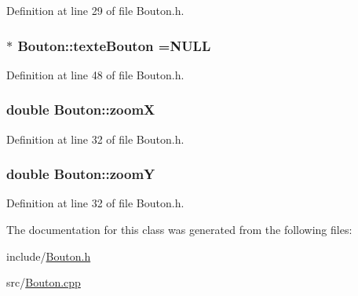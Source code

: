 Definition at line 29 of file Bouton.\+h.

\hypertarget{class_bouton_a71cfadd4002fcb9f21feeea2ace385be}{}
\subsubsection[{texte\+Bouton}]{$\ast$ Bouton\+::texte\+Bouton ={\bf N\+U\+L\+L}}\label{class_bouton_a71cfadd4002fcb9f21feeea2ace385be}


Definition at line 48 of file Bouton.\+h.

\hypertarget{class_bouton_ad2f8b0abcd023cbca599bca0af297192}{}
\subsubsection[{zoom\+X}]{\setlength{\rightskip}{0pt plus 5cm}double Bouton\+::zoom\+X}\label{class_bouton_ad2f8b0abcd023cbca599bca0af297192}


Definition at line 32 of file Bouton.\+h.

\hypertarget{class_bouton_a47c6955b1d8b9e75b1c0ef72ef2a585f}{}
\subsubsection[{zoom\+Y}]{\setlength{\rightskip}{0pt plus 5cm}double Bouton\+::zoom\+Y}\label{class_bouton_a47c6955b1d8b9e75b1c0ef72ef2a585f}


Definition at line 32 of file Bouton.\+h.



The documentation for this class was generated from the following files\+:\begin{DoxyCompactItemize}
\item 
include/\hyperlink{_bouton_8h}{Bouton.\+h}\item 
src/\hyperlink{_bouton_8cpp}{Bouton.\+cpp}\end{DoxyCompactItemize}
